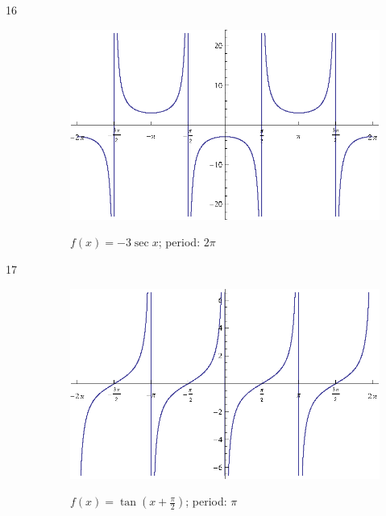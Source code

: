 \documentclass{exam}
\begin{document}
\begin{description}
      \item[16]
        \begin{figure}[H]
          \centering
          \includegraphics[scale=0.9]{exercise16.eps}

          $f(x) = -3 \sec x$; period: $2 \pi$
        \end{figure}

      \item[17]
        \begin{figure}[H]
          \centering
          \includegraphics[scale=0.9]{exercise17.eps}

          $f(x) = \tan \left( x + \frac{\pi}{2} \right)$; period: $\pi$
        \end{figure}


\end{description}
\end{document}
